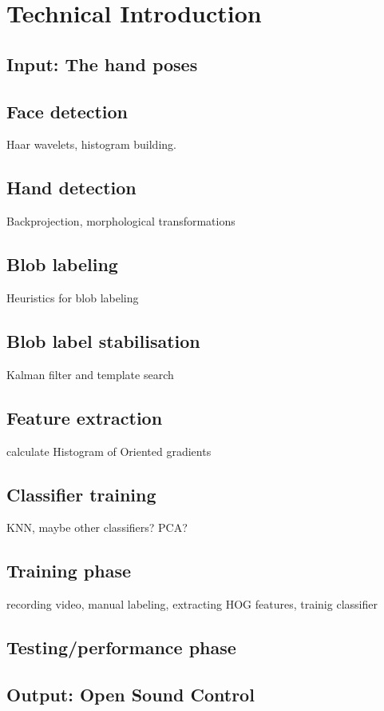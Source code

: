 
\chapter{Technical Introduction}
\label{ch:techintro}

\section{Input: The hand poses}

\section{Face detection}
Haar wavelets, histogram building.

\section{Hand detection}
Backprojection, morphological transformations

\section{Blob labeling}
Heuristics for blob labeling

\section{Blob label stabilisation}
Kalman filter and template search

\section{Feature extraction}
calculate Histogram of Oriented gradients\cite{watanabe2009}

\section{Classifier training}
KNN, maybe other classifiers? PCA?

\section{Training phase}
recording video, manual labeling, extracting HOG features, trainig classifier

\section{Testing/performance phase}

\section{Output: Open Sound Control}
